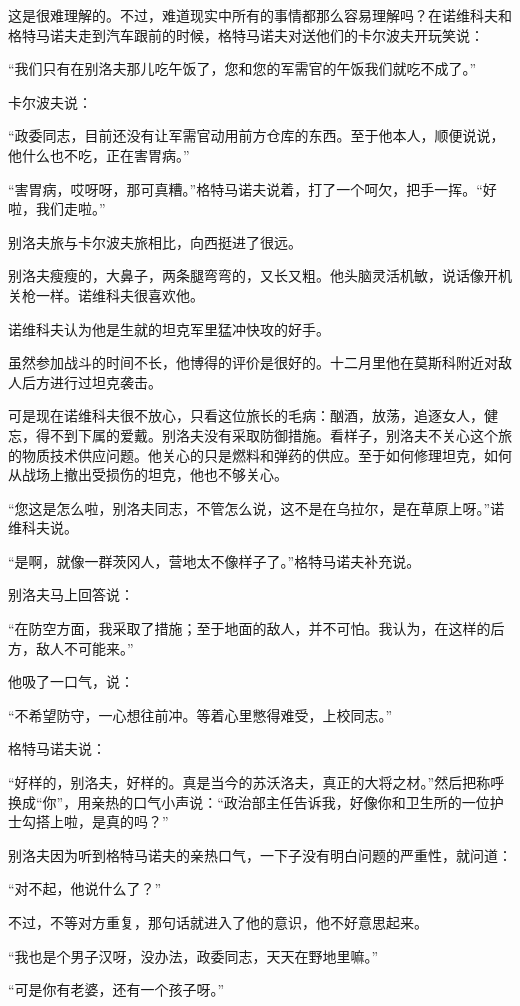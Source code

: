 这是很难理解的。不过，难道现实中所有的事情都那么容易理解吗？在诺维科夫和格特马诺夫走到汽车跟前的时候，格特马诺夫对送他们的卡尔波夫开玩笑说：

“我们只有在别洛夫那儿吃午饭了，您和您的军需官的午饭我们就吃不成了。”

卡尔波夫说：

“政委同志，目前还没有让军需官动用前方仓库的东西。至于他本人，顺便说说，他什么也不吃，正在害胃病。”

“害胃病，哎呀呀，那可真糟。”格特马诺夫说着，打了一个呵欠，把手一挥。“好啦，我们走啦。”

别洛夫旅与卡尔波夫旅相比，向西挺进了很远。

别洛夫瘦瘦的，大鼻子，两条腿弯弯的，又长又粗。他头脑灵活机敏，说话像开机关枪一样。诺维科夫很喜欢他。

诺维科夫认为他是生就的坦克军里猛冲快攻的好手。

虽然参加战斗的时间不长，他博得的评价是很好的。十二月里他在莫斯科附近对敌人后方进行过坦克袭击。

可是现在诺维科夫很不放心，只看这位旅长的毛病：酗酒，放荡，追逐女人，健忘，得不到下属的爱戴。别洛夫没有采取防御措施。看样子，别洛夫不关心这个旅的物质技术供应问题。他关心的只是燃料和弹药的供应。至于如何修理坦克，如何从战场上撤出受损伤的坦克，他也不够关心。

“您这是怎么啦，别洛夫同志，不管怎么说，这不是在乌拉尔，是在草原上呀。”诺维科夫说。

“是啊，就像一群茨冈人，营地太不像样子了。”格特马诺夫补充说。

别洛夫马上回答说：

“在防空方面，我采取了措施；至于地面的敌人，并不可怕。我认为，在这样的后方，敌人不可能来。”

他吸了一口气，说：

“不希望防守，一心想往前冲。等着心里憋得难受，上校同志。”

格特马诺夫说：

“好样的，别洛夫，好样的。真是当今的苏沃洛夫，真正的大将之材。”然后把称呼换成“你”，用亲热的口气小声说：“政治部主任告诉我，好像你和卫生所的一位护士勾搭上啦，是真的吗？”

别洛夫因为听到格特马诺夫的亲热口气，一下子没有明白问题的严重性，就问道：

“对不起，他说什么了？”

不过，不等对方重复，那句话就进入了他的意识，他不好意思起来。

“我也是个男子汉呀，没办法，政委同志，天天在野地里嘛。”

“可是你有老婆，还有一个孩子呀。”

